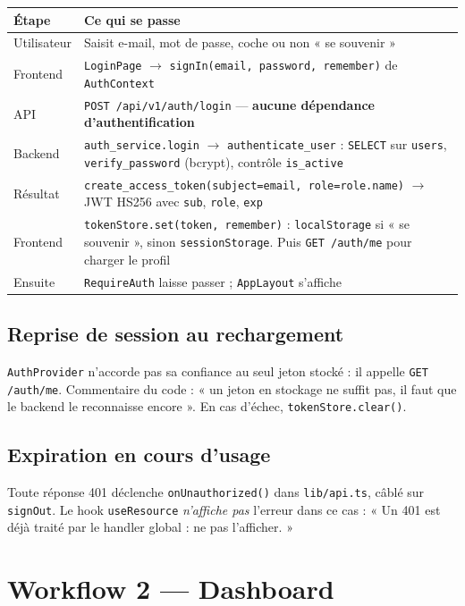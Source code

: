 \documentclass[11pt,a4paper]{report}
\newcommand{\file}[1]{\texttt{\small #1}}
\newcommand{\fn}[1]{\texttt{\small\textcolor{oasisviolet}{#1}}}
\newcommand{\cls}[1]{\texttt{\small\textcolor{oasisblue}{#1}}}
\newcommand{\tbl}[1]{\texttt{\small\textcolor{oasisamber}{#1}}}
\newcommand{\route}[1]{\texttt{\small\textcolor{oasisgreen}{#1}}}
\newcommand{\arrowto}{\ensuremath{\rightarrow}}
\begin{document}
\begin{longtable}{@{}p{2.9cm}p{11.9cm}@{}}
\toprule
\textbf{Étape} & \textbf{Ce qui se passe}\\
\midrule
\endhead
Utilisateur & Saisit e-mail, mot de passe, coche ou non « se souvenir »\\
Frontend & \cls{LoginPage} \arrowto{} \fn{signIn(email, password, remember)} de \cls{AuthContext}\\
API & \route{POST /api/v1/auth/login} --- \textbf{aucune dépendance d'authentification}\\
Backend & \fn{auth\_service.login} \arrowto{} \fn{authenticate\_user} : \texttt{SELECT} sur \tbl{users}, \fn{verify\_password} (bcrypt), contrôle \texttt{is\_active}\\
Résultat & \fn{create\_access\_token(subject=email, role=role.name)} \arrowto{} JWT HS256 avec \texttt{sub}, \texttt{role}, \texttt{exp}\\
Frontend & \fn{tokenStore.set(token, remember)} : \texttt{localStorage} si « se souvenir », sinon \texttt{sessionStorage}. Puis \route{GET /auth/me} pour charger le profil\\
Ensuite & \cls{RequireAuth} laisse passer ; \cls{AppLayout} s'affiche\\
\bottomrule
\end{longtable}

\subsection*{Reprise de session au rechargement}
\cls{AuthProvider} n'accorde pas sa confiance au seul jeton stocké : il appelle
\route{GET /auth/me}. Commentaire du code : « un jeton en stockage ne suffit
pas, il faut que le backend le reconnaisse encore ». En cas d'échec,
\fn{tokenStore.clear()}.

\subsection*{Expiration en cours d'usage}
Toute réponse 401 déclenche \fn{onUnauthorized()} dans \file{lib/api.ts}, câblé
sur \fn{signOut}. Le hook \fn{useResource} \emph{n'affiche pas} l'erreur dans ce
cas : « Un 401 est déjà traité par le handler global : ne pas l'afficher. »

\section{Workflow 2 --- Dashboard}
\end{document}
